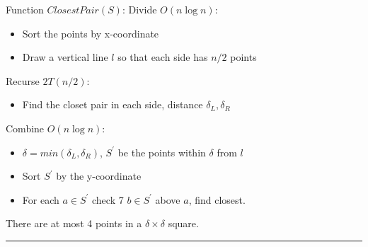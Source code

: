 \documentclass[10pt, a4paper, twocolumn]{article}
\begin{document}
\begin{enumerate}[leftmargin = 12pt, topsep = 0pt, itemsep=0pt, partopsep = 0pt]
        Function $ClosestPair(S)$: Divide $O(n\log n)$:
        \begin{itemize}[leftmargin = 12pt, topsep = 0pt, itemsep=0pt, partopsep = 0pt]
        \item Sort the points by x-coordinate
        \item Draw a vertical line $l$ so that each side has $n/2$ points
        \end{itemize}
        Recurse $2T(n/2)$:
        \begin{itemize}[leftmargin = 12pt, topsep = 0pt, itemsep=0pt, partopsep = 0pt]
        \item Find the closet pair in each side, distance $\delta_L,\delta_R$
        \end{itemize}
        Combine $O(n\log n)$:
        \begin{itemize}[leftmargin = 12pt, topsep = 0pt, itemsep=0pt, partopsep = 0pt]
        \item $\delta = min(\delta_L,\delta_R)$, $S^{'}$ be the points within $\delta$ from $l$
        \item Sort $S^{'}$ by the y-coordinate
        \item For each $a\in S^{'}$ check 7 $b\in S^{'}$ above $a$, find closest.
        \end{itemize}
        There are at most 4 points in a $\delta\times\delta$ square.
\end{enumerate}
\vspace{0.1cm}
\hrule
\end{document}
